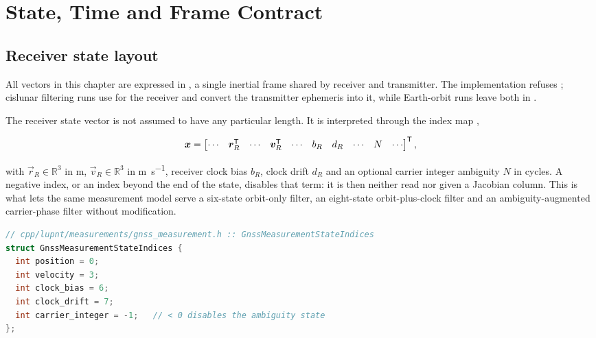 \section{State, Time and Frame Contract}
\label{sec:gnss-contract}

\subsection{Receiver state layout}

All vectors in this chapter are expressed in , a single
inertial frame shared by receiver and transmitter. The implementation refuses
; cislunar filtering runs use  for
the receiver and convert the transmitter ephemeris into it, while Earth-orbit
runs leave both in .

The receiver state vector is not assumed to have any particular length. It is
interpreted through the index map ,

\begin{equation}
  \label{eq:gnss-state-layout}
  \bm{x} =
  \begin{bmatrix}
    \cdots & \bm{r}_R^{\mathsf{T}} & \cdots & \bm{v}_R^{\mathsf{T}} & \cdots &
    b_R & d_R & \cdots & N & \cdots
  \end{bmatrix}^{\mathsf{T}} ,
\end{equation}

with $\vec{r}_R \in \mathbb{R}^3$ in \si{\meter}, $\vec{v}_R \in \mathbb{R}^3$
in \si{\meter\per\second}, receiver clock bias $b_R$, clock drift $d_R$ and an
optional carrier integer ambiguity $N$ in cycles. A negative index, or an
index beyond the end of the state, disables that term: it is then neither read
nor given a Jacobian column. This is what lets the same measurement model
serve a six-state orbit-only filter, an eight-state orbit-plus-clock filter
and an ambiguity-augmented carrier-phase filter without modification.

\begin{lstlisting}[language=cpp, caption={Receiver state index map and its
defaults.}, label={lst:gnss-indices}]
// cpp/lupnt/measurements/gnss_measurement.h :: GnssMeasurementStateIndices
struct GnssMeasurementStateIndices {
  int position = 0;
  int velocity = 3;
  int clock_bias = 6;
  int clock_drift = 7;
  int carrier_integer = -1;   // < 0 disables the ambiguity state
};
\end{lstlisting}

